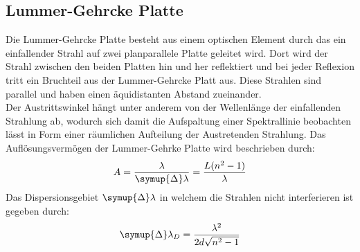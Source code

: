 \subsection{Lummer-Gehrcke Platte}
\label{sec:lgplatte}

Die Lummer-Gehrcke Platte besteht aus einem optischen Element durch das ein einfallender Strahl auf zwei planparallele Platte geleitet wird. Dort wird der Strahl zwischen den beiden Platten hin und her reflektiert und bei jeder Reflexion tritt ein Bruchteil aus der Lummer-Gehrcke Platt aus. Diese Strahlen sind parallel und haben einen äquidistanten Abstand zueinander.\\
Der Austrittswinkel hängt unter anderem von der Wellenlänge der einfallenden Strahlung ab, wodurch sich damit die Aufspaltung einer Spektrallinie beobachten lässt in Form einer räumlichen Aufteilung der Austretenden Strahlung.
Das Auflösungsvermögen der Lummer-Gehrke Platte wird beschrieben durch:
\begin{equation}
    \label{eq:aufloesungsvermoegen}
    A=\frac{\lambda}{\symup{\Delta}\lambda}=\frac{L(n^2-1)}{\lambda}
\end{equation}
Das Dispersionsgebiet $\symup{\Delta}\lambda$ in welchem die Strahlen nicht interferieren ist gegeben durch:
\begin{equation}
    \label{eq:dispersionsgebiet}
    \symup{\Delta}\lambda_D=\frac{\lambda^2}{2d\sqrt{n^2-1}}
\end{equation}
























